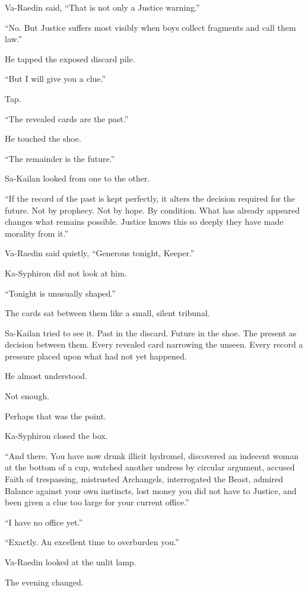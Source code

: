 Va-Raedin said, “That is not only a Justice warning.”\par
“No. But Justice suffers most visibly when boys collect fragments and call them law.”\par
He tapped the exposed discard pile.\par
“But I will give you a clue.”\par
Tap.\par
“The revealed cards are the past.”\par
He touched the shoe.\par
“The remainder is the future.”\par
Sa-Kailan looked from one to the other.\par
“If the record of the past is kept perfectly, it alters the decision required for the future. Not by prophecy. Not by hope. By condition. What has already appeared changes what remains possible. Justice knows this so deeply they have made morality from it.”\par
Va-Raedin said quietly, “Generous tonight, Keeper.”\par
Ka-Syphiron did not look at him.\par
“Tonight is unusually shaped.”\par
The cards sat between them like a small, silent tribunal.\par
Sa-Kailan tried to see it. Past in the discard. Future in the shoe. The present as decision between them. Every revealed card narrowing the unseen. Every record a pressure placed upon what had not yet happened.\par
He almost understood.\par
Not enough.\par
Perhaps that was the point.\par
Ka-Syphiron closed the box.\par
“And there. You have now drunk illicit hydromel, discovered an indecent woman at the bottom of a cup, watched another undress by circular argument, accused Faith of trespassing, mistrusted Archangels, interrogated the Beast, admired Balance against your own instincts, lost money you did not have to Justice, and been given a clue too large for your current office.”\par
“I have no office yet.”\par
“Exactly. An excellent time to overburden you.”\par
Va-Raedin looked at the unlit lamp.\par
The evening changed.\par
